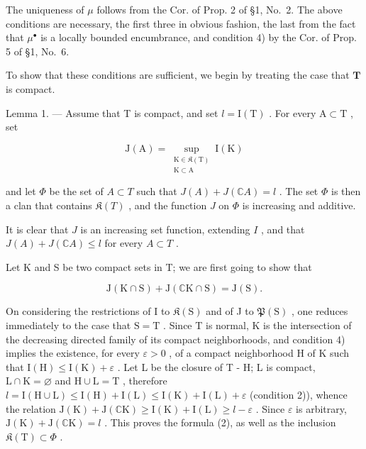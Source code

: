 The uniqueness of \(\mu\) follows from the Cor. of Prop. 2 of §1, No.~2. The above conditions are necessary, the first three in obvious fashion, the last from the fact that \(\mu^{\bullet}\) is a locally bounded encumbrance, and condition 4) by the Cor. of Prop. 5 of §1, No.~6.

To show that these conditions are sufficient, we begin by treating the case that \(\mathbf{T}\) is compact.

Lemma 1. --- Assume that T is compact, and set \(l = \mathrm{I}(\mathrm{T})\) . For every \(\mathrm{A} \subset \mathrm{T}\) , set

\[
\mathrm{J}(\mathrm{A}) = \sup_{\substack{\mathrm{K}\in \mathfrak{K}(\mathrm{T})\\ \mathrm{K}\subset \mathrm{A}}}\mathrm{I}(\mathrm{K})\tag{1}
\]

and let \(\Phi\) be the set of \(A \subset T\) such that \(J(A) + J(\mathbb{C}A) = l\) . The set \(\Phi\) is then a clan that contains \(\mathfrak{K}(T)\) , and the function \(J\) on \(\Phi\) is increasing and additive.

It is clear that \(J\) is an increasing set function, extending \(I\) , and that \(J(A) + J(\mathbb{C}A) \leqslant l\) for every \(A \subset T\) .

Let K and S be two compact sets in T; we are first going to show that

\[
\mathrm{J} (\mathrm{K} \cap \mathrm{S}) + \mathrm{J} (\mathbb {C} \mathrm{K} \cap \mathrm{S}) = \mathrm{J} (\mathrm{S}).\tag{2}
\]

On considering the restrictions of I to \(\mathfrak{K}(\mathrm{S})\) and of J to \(\mathfrak{P}(\mathrm{S})\) , one reduces immediately to the case that \(\mathrm{S} = \mathrm{T}\) . Since T is normal, K is the intersection of the decreasing directed family of its compact neighborhoods, and condition 4) implies the existence, for every \(\varepsilon > 0\) , of a compact neighborhood H of K such that \(\mathrm{I}(\mathrm{H}) \leqslant \mathrm{I}(\mathrm{K}) + \varepsilon\) . Let L be the closure of T - H; L is compact, \(\mathrm{L} \cap \mathrm{K} = \varnothing\) and \(\mathrm{H} \cup \mathrm{L} = \mathrm{T}\) , therefore \(l = \mathrm{I}(\mathrm{H} \cup \mathrm{L}) \leqslant \mathrm{I}(\mathrm{H}) + \mathrm{I}(\mathrm{L}) \leqslant \mathrm{I}(\mathrm{K}) + \mathrm{I}(\mathrm{L}) + \varepsilon\) (condition 2)), whence the relation \(\mathrm{J}(\mathrm{K}) + \mathrm{J}(\mathbb{C}\mathrm{K}) \geqslant \mathrm{I}(\mathrm{K}) + \mathrm{I}(\mathrm{L}) \geqslant l - \varepsilon\) . Since \(\varepsilon\) is arbitrary, \(\mathrm{J}(\mathrm{K}) + \mathrm{J}(\mathbb{C}\mathrm{K}) = l\) . This proves the formula (2), as well as the inclusion \(\mathfrak{K}(\mathrm{T}) \subset \Phi\) .

